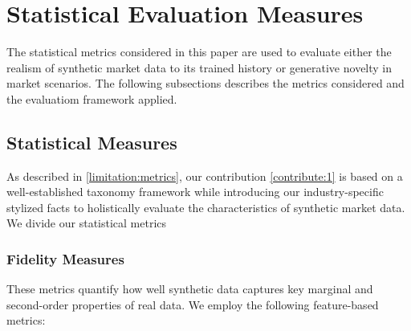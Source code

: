 
  \section{Statistical Evaluation Measures}\label{sec:stat-eval}
    The statistical metrics considered in this paper are used to
    evaluate either the realism of synthetic market data to its
    trained history or generative novelty in market scenarios.
    The following subsections describes the metrics considered and
    the evaluatiom framework applied.
    
    \subsection{Statistical Measures}\label{subsec:stats-measure}
    As described in \ref{limitation:metrics}, our contribution 
    \ref{contribute:1} is based on a well-established taxonomy framework
    \cite{Stenger24} while introducing our industry-specific stylized
    facts to holistically evaluate the characteristics of synthetic
    market data. We divide our statistical metrics
    \subsubsection{Fidelity Measures}
    These metrics quantify how well synthetic data captures key 
    marginal and second-order properties of real data. We employ
    the following feature-based metrics:

